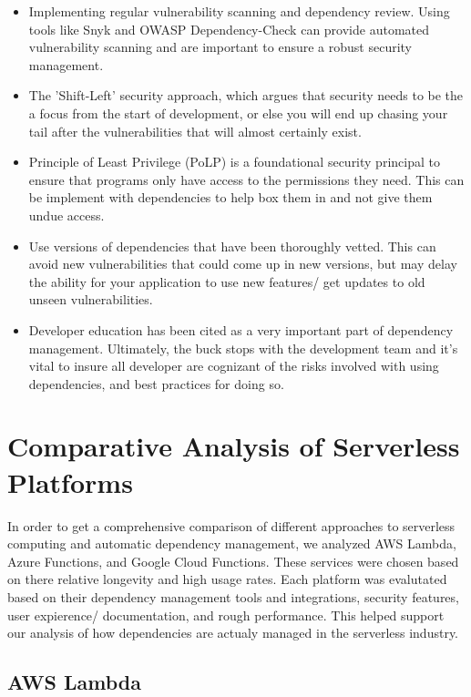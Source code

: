 \documentclass[sigconf]{acmart}
\begin{document}
\begin{itemize}
	\item Implementing regular vulnerability scanning and dependency review. Using tools like Snyk and OWASP Dependency-Check can provide automated vulnerability scanning and are important to ensure a robust security management.
	\item The 'Shift-Left' security approach, which argues that security needs to be the a focus from the start of development, or else you will end up chasing your tail after the vulnerabilities that will almost certainly exist. 
	\item Principle of Least Privilege (PoLP) is a foundational security principal to ensure that programs only have access to the permissions they need. This can be implement with dependencies to help box them in and not give them undue access. 
	\item Use versions of dependencies that have been thoroughly vetted. This can avoid new vulnerabilities that could come up in new versions, but may delay the ability for your application to use new features/ get updates to old unseen vulnerabilities. 
	\item Developer education has been cited as a very important part of dependency management. Ultimately, the buck stops with the development team and it's vital to insure all developer are cognizant of the risks involved with using dependencies, and best practices for doing so. 
	
\end{itemize}

\section{Comparative Analysis of Serverless Platforms}

In order to get a comprehensive comparison of different approaches to serverless computing and automatic dependency management, we analyzed AWS Lambda, Azure Functions, and Google Cloud Functions. These services were chosen based on there relative longevity and high usage rates. Each platform was evalutated based on their dependency management tools and integrations, security features, user expierence/ documentation, and rough performance. This helped support our analysis of how dependencies are actualy managed in the serverless industry.

\subsection{AWS Lambda}
\end{document}
